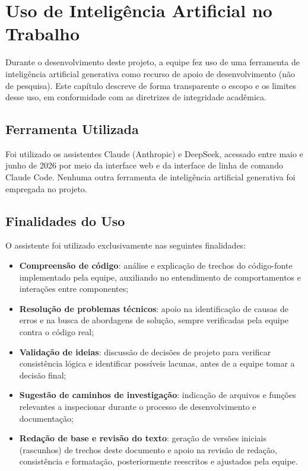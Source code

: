 \documentclass[
    12pt
    ,oneside
    ,a4paper
    ,chapter=TITLE
    ,section=TITLE
    ,sumario=abnt-6027-2012]{abntex2}
\begin{document}
\chapter{Uso de Inteligência Artificial no Trabalho}
\label{cap:ia}

Durante o desenvolvimento deste projeto, a equipe fez uso de uma ferramenta de
inteligência artificial generativa como recurso de apoio de desenvolvimento (não de pesquisa). Este capítulo descreve de forma transparente o escopo e os limites desse uso, em conformidade com as diretrizes de integridade acadêmica.

\section{Ferramenta Utilizada}
\label{sec:ia-ferramenta}

Foi utilizado os assistentes Claude (Anthropic) e DeepSeek, acessado entre maio e junho de 2026
por meio da interface web e da interface de linha de comando Claude Code. Nenhuma
outra ferramenta de inteligência artificial generativa foi empregada no projeto.

\section{Finalidades do Uso}
\label{sec:ia-finalidades}

O assistente foi utilizado exclusivamente nas seguintes finalidades:

\begin{itemize}
    \item \textbf{Compreensão de código}: análise e explicação de trechos do
          código-fonte implementado pela equipe, auxiliando no entendimento de
          comportamentos e interações entre componentes;
    \item \textbf{Resolução de problemas técnicos}: apoio na identificação de causas
          de erros e na busca de abordagens de solução, sempre verificadas pela
          equipe contra o código real;
    \item \textbf{Validação de ideias}: discussão de decisões de projeto para
          verificar consistência lógica e identificar possíveis lacunas, antes de
          a equipe tomar a decisão final;
    \item \textbf{Sugestão de caminhos de investigação}: indicação de arquivos e
          funções relevantes a inspecionar durante o processo de desenvolvimento e
          documentação;
    \item \textbf{Redação de base e revisão do texto}: geração de versões iniciais
          (rascunhos) de trechos deste documento e apoio na revisão de redação,
          consistência e formatação, posteriormente reescritos e ajustados pela equipe.
\end{itemize}
\end{document}

